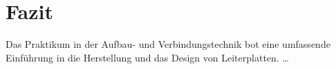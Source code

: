 
\section{Fazit}
Das Praktikum in der Aufbau- und Verbindungstechnik bot eine umfassende Einführung in die Herstellung und das Design von Leiterplatten. \ldots

